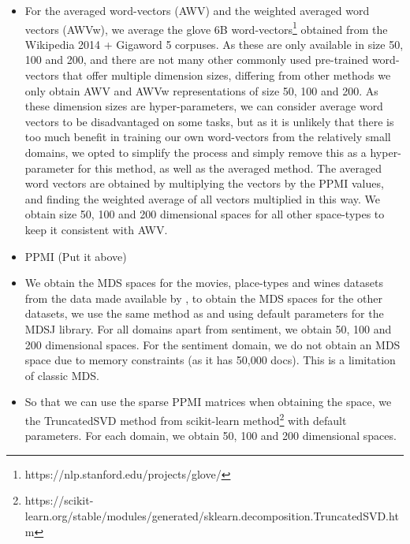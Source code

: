 \begin{itemize}
	\item For the averaged word-vectors (AWV) and the weighted averaged word vectors (AWVw), we average the glove 6B word-vectors\footnote{https://nlp.stanford.edu/projects/glove/} obtained from the Wikipedia 2014 + Gigaword 5 corpuses. As these are only available in size 50, 100 and 200, and there are not many other commonly used pre-trained word-vectors that offer multiple dimension sizes, differing from other methods we only obtain AWV and AWVw representations of size 50, 100 and 200. As these dimension sizes are hyper-parameters, we can consider average word vectors to be disadvantaged on some tasks, but as it is unlikely that there is too much benefit in training our own word-vectors from the relatively small domains, we opted to simplify the process and simply remove this as a hyper-parameter for this method, as well as the averaged method. The averaged word vectors are obtained by multiplying the vectors by the PPMI values, and finding the weighted average of all vectors multiplied in this way. We obtain size 50, 100 and 200 dimensional spaces for all other space-types to keep it consistent with AWV. %
	\item PPMI (Put it above)
	\item We obtain the MDS spaces for the movies, place-types and wines datasets from the data made available by \cite{Derrac2015}, to obtain the MDS spaces for the other datasets, we use the same method as \cite{Derrac2015} and using default parameters for the MDSJ library. For all domains apart from sentiment, we obtain 50, 100 and 200 dimensional spaces. For the sentiment domain, we do not obtain an MDS space due to memory constraints (as it has 50,000 docs). This is a limitation of classic MDS.
	\item So that we can use the sparse PPMI matrices when obtaining the space, we the TruncatedSVD method from scikit-learn method\footnote{https://scikit-learn.org/stable/modules/generated/sklearn.decomposition.TruncatedSVD.htm} with default parameters. For each domain, we obtain 50, 100 and 200 dimensional spaces. %
	

\end{itemize}
